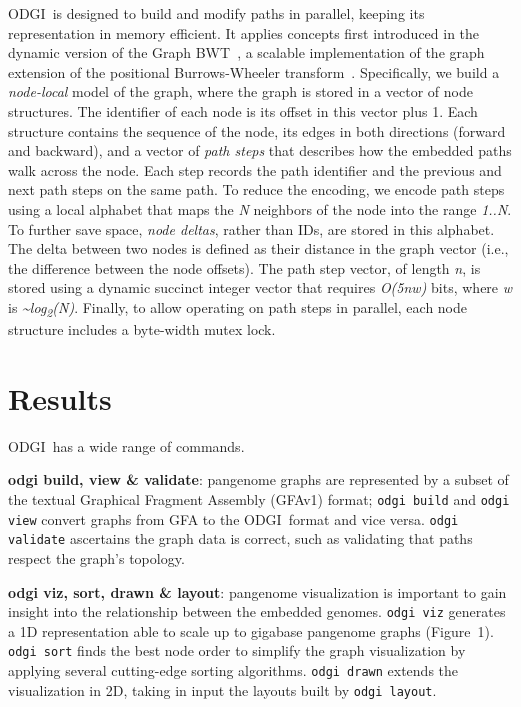 \documentclass{bioinfo}
\newcommand{\odgi}{ODGI}
\newcommand{\cmd}[1]{{\texttt{#1}}}
\newcommand{\cmdbf}[1]{{\textbf{#1}}}
\newcommand{\topic}[1]{{\cmdbf{#1}}:}
\begin{document}
    \odgi\ is designed to build and modify paths in parallel, keeping its representation in memory efficient. It
    applies concepts first introduced in the dynamic version of the Graph BWT~\citep{31406990}, a scalable
    implementation of the graph extension of the positional Burrows-Wheeler transform~\citep{28702075}. Specifically,
    we build a \textit{node-local} model of the graph, where the graph is stored in a vector of node structures.
    The identifier of each node is its offset in this vector plus 1. Each structure contains the sequence of the
    node, its edges in both directions (forward and backward), and a vector of \textit{path steps} that describes
    how the embedded paths walk across the node. Each step records the path identifier and the previous and next
    path steps on the same path. To reduce the encoding, we encode path steps using a local alphabet that maps the
    \textit{N} neighbors of the node into the range \textit{1..N}. To further save space, \textit{node deltas},
    rather than IDs, are stored in this alphabet. The delta between two nodes is defined as their distance in the
    graph vector (i.e., the difference between the node offsets). The path step vector, of length \textit{n}, is
    stored using a dynamic succinct integer vector that requires \textit{O(5nw)} bits, where \textit{w} is
    \textit{\textasciitilde log\textsubscript{2}(N)}. Finally, to allow operating on path steps in parallel, each node
    structure includes a byte-width mutex lock.


    \section{Results}

    \odgi\ has a wide range of commands.

    \topic{odgi build, view \& validate} pangenome graphs are
    represented by a subset of the textual Graphical Fragment Assembly
    (GFAv1) format\citep{GFAv1}; \cmd{odgi build} and \cmd{odgi view}
    convert graphs from GFA to the \odgi\ format and vice versa.
    \cmd{odgi validate} ascertains the graph data is correct, such as
    validating that paths respect the graph's topology.

    \topic{odgi viz, sort, drawn \& layout} pangenome visualization is important to gain insight
    into the relationship between the embedded genomes. \cmd{odgi viz} generates a 1D representation
    able to scale up to gigabase pangenome graphs (Figure~1\vphantom{\ref{fig:1}}).
    \cmd{odgi sort} finds the best node order to simplify the graph visualization by applying several
    cutting-edge sorting algorithms. \cmd{odgi drawn} extends the visualization in 2D,
    taking in input the layouts built by \cmd{odgi layout}.
\end{document}
